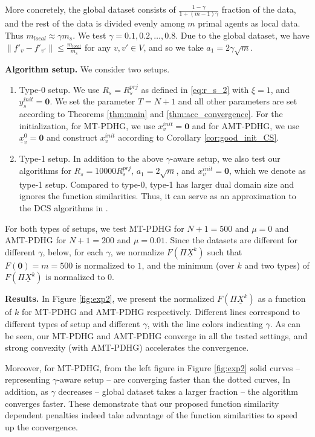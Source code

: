 \documentclass[10pt]{article}
\newcommand{\mb}{\mathbf}
\begin{document}
More concretely, the global dataset consists of $\frac{1-\gamma}{1+(m-1)\gamma}$ fraction of the data, and the rest of the data is divided evenly among $m$ primal agents as local data. Thus $m_{local} \approx \gamma m_s  $. We test $\gamma = 0.1,0.2,\ldots,0.8$. Due to the global dataset, we have $\|f'_v-f'_{v'}\|\leq \frac{m_{local}}{m_s}$ for any $v,v'\in V$, and so we take $a_1 = 2\gamma \sqrt{m}$.

\textbf{Algorithm setup.} We consider two setups.
\begin{enumerate}
    \item Type-0 setup. We use $R_s = R_s^{prj}$ as defined in \eqref{eq:r_s_2} with $\xi = 1$, and $y_s^{init} = \mb 0$. We set the parameter $T=N+1$ and all other parameters are set according to Theorems \ref{thm:main} and \ref{thm:acc_convergence}. For the initialization, for MT-PDHG, we use $x_v^{init} = \mb 0$ and for AMT-PDHG, we use $\underline{x}_v^0 = \mb 0$ and construct $x_v^{init}$ according to Corollary \ref{cor:good_init_CS}. 
    \item Type-1 setup. In addition to the above $\gamma$-aware setup, we also test our algorithms for $R_s = 10000R_s^{prj}$, $a_1 = 2 \sqrt{m}$, and $x_v^{init} = \mb 0$, which we denote as type-1 setup. Compared to type-0, type-1 has larger dual domain size and ignores the function similarities. Thus, it can serve as an approximation to the DCS algorithms in \cite{lan_communication-efficient_2020}. 
\end{enumerate}
For both types of setups, we test MT-PDHG for $N+1 = 500$ and $\mu = 0$ and AMT-PDHG for $N+1 = 200$ and $\mu = 0.01$. Since the datasets are different for different $\gamma$, below, for each $\gamma$, we normalize $F(\Pi \underline{X}^k)$ such that $F(\mb 0) = m=500$ is normalized to $1$, and the minimum (over $k$ and two types) of $F(\Pi \underline{X}^k)$ is normalized to $0$. 


\textbf{Results.} 
 In Figure \ref{fig:exp2}, we present the normalized $F(\Pi \underline{X}^k)$ as a function of $k$ for MT-PDHG and AMT-PDHG respectively. Different lines correspond to different types of setup and different $\gamma$, with the line colors indicating $\gamma$. As can be seen, our MT-PDHG and AMT-PDHG converge in all the tested settings, and strong convexity (with AMT-PDHG) accelerates the convergence. 
 
Moreover, for MT-PDHG, from the left figure in Figure \ref{fig:exp2} solid curves -- representing $\gamma$-aware setup -- are converging faster than the dotted curves, In addition, as $\gamma$ decreases -- global dataset takes a larger fraction -- the algorithm converges faster. These demonstrate that our proposed function similarity dependent penalties indeed take advantage of the function similarities to speed up the convergence. 
\end{document}
